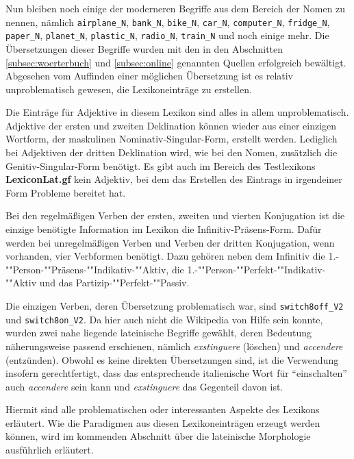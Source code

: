 Nun bleiben noch einige der moderneren Begriffe aus dem Bereich der Nomen zu nennen, nämlich \texttt{airplane\_N}, \texttt{bank\_N}, \texttt{bike\_N}, \texttt{car\_N}, \texttt{computer\_N}, \texttt{fridge\_N}, \texttt{paper\_N}, \texttt{planet\_N}, \texttt{plastic\_N}, \texttt{radio\_N}, \texttt{train\_N} und noch einige mehr. Die Übersetzungen dieser Begriffe wurden mit den in den Abschnitten \ref{subsec:woerterbuch} und \ref{subsec:online} genannten Quellen erfolgreich bewältigt. Abgesehen vom Auffinden einer möglichen Übersetzung ist es relativ unproblematisch gewesen, die Lexikoneinträge zu erstellen. \par
Die Einträge für Adjektive in diesem Lexikon sind alles in allem unproblematisch. Adjektive der ersten und zweiten Deklination können wieder aus einer einzigen Wortform, der maskulinen Nominativ-Singular-Form, erstellt werden. Lediglich bei Adjektiven der dritten Deklination wird, wie bei den Nomen, zusätzlich die Genitiv-Singular-Form benötigt. Es gibt auch im Bereich des Testlexikons \textbf{LexiconLat.gf} kein Adjektiv, bei dem das Erstellen des Eintrags in irgendeiner Form Probleme bereitet hat. \par
Bei den regelmäßigen Verben der ersten, zweiten und vierten Konjugation ist die einzige benötigte Information im Lexikon die Infinitiv-Präsens-Form. Dafür werden bei unregelmäßigen Verben und Verben der dritten Konjugation, wenn vorhanden, vier Verbformen benötigt. Dazu gehören neben dem Infinitiv die 1.-""Person-""Präsens-""Indikativ-""Aktiv, die 1.-""Per\-son-""Per\-fekt-""In\-di\-ka\-tiv-""Ak\-tiv und das Par\-ti\-zip-""Per\-fekt-""Passiv. \par
Die einzigen Verben, deren Übersetzung problematisch war, sind \texttt{switch8off\_V2} und \texttt{switch8on\_V2}. Da hier auch nicht die Wikipedia von Hilfe sein konnte, wurden zwei nahe liegende lateinische Begriffe gewählt, deren Bedeutung näherungsweise passend erschienen, nämlich \textit{exstinguere} (löschen) und \textit{accendere} (entzünden). Obwohl es keine direkten Übersetzungen sind, ist die Verwendung insofern gerechtfertigt, dass das entsprechende italienische Wort für ``einschalten'' auch \textit{accendere} sein kann und \textit{exstinguere} das Gegenteil davon ist. \par
Hiermit sind alle problematischen oder interessanten Aspekte des Lexikons erläutert. Wie die Paradigmen aus diesen Lexikoneinträgen erzeugt werden können, wird im kommenden Abschnitt über die lateinische Morphologie ausführlich erläutert.